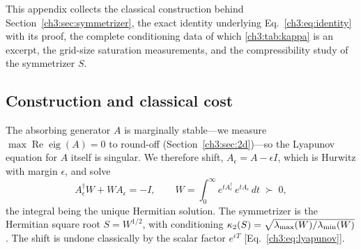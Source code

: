 %

\makeatletter
{}
\makeatother

\label{ch3:appE:symmetrizer}

This appendix collects the classical construction behind
Section~\ref{ch3:sec:symmetrizer}, the exact identity underlying
Eq.~\eqref{ch3:eq:identity} with its proof, the complete conditioning data
of which \ref{ch3:tab:kappa} is an excerpt, the grid-size saturation
measurements, and the compressibility study of the symmetrizer $S$.

\subsection{Construction and classical cost}
\label{ch3:appE:construction}

The absorbing generator $A$ is marginally stable---we measure
$\max\operatorname{Re}\operatorname{eig}(A)=0$ to round-off
(Section~\ref{ch3:sec:2d})---so the Lyapunov equation for $A$ itself is
singular.  We therefore shift, $A_\epsilon = A-\epsilon I$, which is
Hurwitz with margin $\epsilon$, and solve
\begin{equation}
  A_\epsilon^{\dagger}W + WA_\epsilon = -I,
  \qquad
  W = \int_0^{\infty} e^{tA_\epsilon^{\dagger}}\,e^{tA_\epsilon}\,dt
  \;\succ\;0,
  \label{ch3:appE:eq:lyap}
\end{equation}
the integral being the unique Hermitian solution.  The symmetrizer is
the Hermitian square root $S=W^{1/2}$, with conditioning
$\kappa_2(S)=\sqrt{\lambda_{\max}(W)/\lambda_{\min}(W)}$.  The shift is undone
classically by the scalar factor $e^{\epsilon T}$
[Eq.~\eqref{ch3:eq:lyapunov}].

